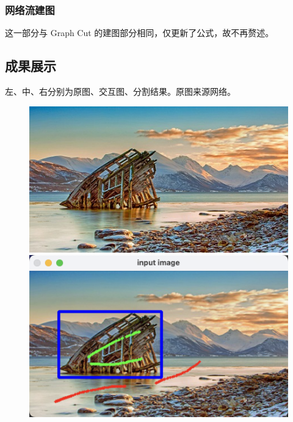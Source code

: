\documentclass[lang=cn,11pt,a4paper]{elegantpaper}
\begin{document}
\subsubsection{网络流建图}

这一部分与 Graph Cut 的建图部分相同，仅更新了公式，故不再赘述。

\subsection{成果展示}

左、中、右分别为原图、交互图、分割结果。原图来源网络。

\begin{figure}[ht]
	\centering
	\begin{minipage}{0.3\linewidth}
		\centering
		\includegraphics[width=0.95\linewidth]{image/boat.jpg}
	\end{minipage}
	\begin{minipage}{0.3\linewidth}
		\centering
		\includegraphics[width=0.95\linewidth]{image/boat_graffiti.png}
	\end{minipage}
	\begin{minipage}{0.3\linewidth}

\end{minipage}
\end{figure}
\end{document}
